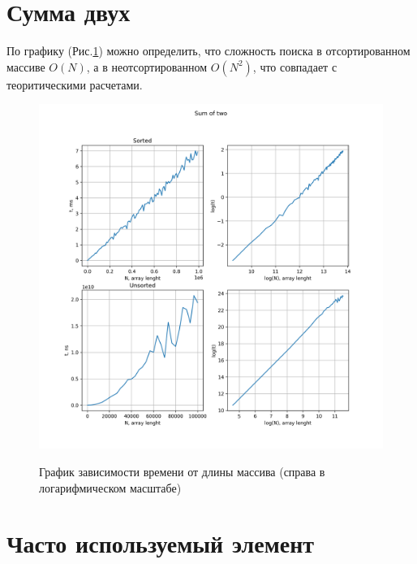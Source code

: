 \documentclass[a4paper, 12pt]{report}
\renewcommand{\figurename}{Рис.}
\begin{document}
	\section*{Сумма двух}
		\par По графику (\figurename\;\ref{fig:sumoftwo}) можно определить, что сложность поиска в отсортированном массиве $O(N)$, а в неотсортированном $O(N^2)$, что совпадает с теоритическими расчетами.
		\begin{figure}[ht!]
			\centering
			{\includegraphics[width=1\linewidth]{./sum_of_two/sumoftwo.png}}
			\caption{График зависимости времени от длины массива (справа в логарифмическом масштабе)}
			\label{fig:sumoftwo}
		\end{figure}
	\section*{Часто используемый элемент}
		
\end{document}
